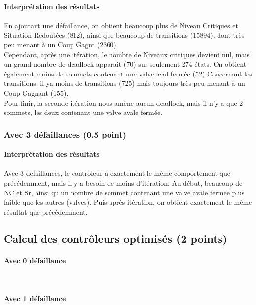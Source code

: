 \documentclass[a4paper]{book}
\begin{document}
\paragraph{Interprétation des résultats}
En ajoutant une défaillance, on obtient beaucoup plus de Niveau Critiques et 
Situation Redoutées (812), ainsi que beaucoup de transitions (15894), dont très peu menant à un Coup Gagnt (2360). \\
Cependant, après une itération, le nombre de Niveaux critiques devient nul, mais un grand nombre de deadlock apparait (70)
sur seulement 274 états. On obtient également moins de sommets contenant une valve aval fermée (52)
Concernant les transitions, il ya moins de transitions (725) mais toujours très peu menant à un Coup Gagnant (155).\\
Pour finir, la seconde itération nous amène aucun deadlock, mais il n'y a que 2 sommets, les deux contenant une valve avale fermée.
\subsubsection{Avec 3 défaillances (0.5 point)}




%
\paragraph{Interprétation des résultats}
Avec 3 defaillances, le controleur a exactement le même comportement que précédemment, mais il y a besoin de moins d'itération. 
Au début, beaucoup de NC et Sr, ainsi qu'un nombre de sommet contenant une valve avale fermée plus faible que les autres (valves).
Puis après itération, on obtient exactement le même résultat que précédemment.

\subsection{Calcul des contrôleurs optimisés (2 points)}
\paragraph{Avec 0 défaillance}\ \\


\paragraph{Avec 1 défaillance}\ \\

\end{document}
